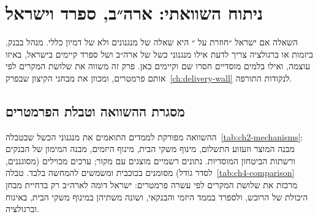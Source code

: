 \chapter{ניתוח השוואתי: ארה״ב, ספרד וישראל}
\label{ch:comparative}

\begin{managerbox}
השאלה אם ישראל ״חוזרת על ״ היא שאלה של מנגנונים ולא של דמיון כללי. מנהל בבנק, ביזמות או ברגולציה צריך לדעת אילו מנגנוני כשל של ארה״ב ושל ספרד קיימים בישראל, באיזו עוצמה, ואילו בלמים מוסדיים חסרו שם וקיימים כאן. פרק זה משווה את שלושת המקרים לפי אותם פרמטרים, ומכוון את מבחני הקיצון שבפרק~\ref{ch:delivery-wall} לנקודות התורפה.
\end{managerbox}

\section{מסגרת ההשוואה וטבלת הפרמטרים}
\label{sec:ch4-table}

ההשוואה מפורקת לממדים התואמים את מנגנוני הכשל שבטבלה~\ref{tab:ch2-mechanisms}: מבנה המוצר וזעזוע התשלום, מינוף משקי הבית, מינוף היזמים, מבנה המימון של הבנקים ורשתות הביטחון המוסדיות. נתונים רשמיים מוצגים עם מקור; ערכים מכוילים (מסוגננים, לסדר גודל) מסומנים בכוכבית ומשמשים להמחשה בלבד. טבלה~\ref{tab:ch4-comparison} מרכזת את שלושת המקרים לפי עשרה פרמטרים: ישראל דומה לארה״ב רק בדחיית מבחן היכולת של הרוכש, ולספרד בממד היזמי והבנקאי, ושונה משתיהן במינוף משקי הבית, באיגוח וברגולציה.

